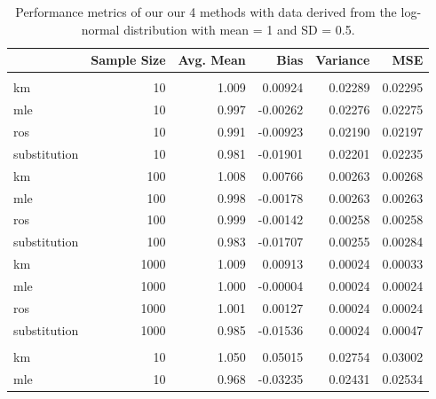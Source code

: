 \documentclass[12pt, twoside]{amherstthesis}
\begin{document}
\begin{table}

\caption{\label{tab:lntable}Performance metrics of our our 
             4 methods with data derived from the log-normal 
             distribution with mean = 1 and SD = 0.5.}
\centering
\fontsize{11.5}{13.5}\selectfont
\begin{tabular}[t]{lrrrrr}
\toprule
  & Sample Size & Avg. Mean & Bias & Variance & MSE\\
\midrule
\addlinespace[0.3em]
\multicolumn{6}{l}{\textbf{Censoring Rate = 0.1}}\\
\hspace{1em}km & 10 & 1.009 & 0.00924 & 0.02289 & 0.02295\\
\hspace{1em}mle & 10 & 0.997 & -0.00262 & 0.02276 & 0.02275\\
\hspace{1em}ros & 10 & 0.991 & -0.00923 & 0.02190 & 0.02197\\
\hspace{1em}substitution & 10 & 0.981 & -0.01901 & 0.02201 & 0.02235\\
\hspace{1em}km & 100 & 1.008 & 0.00766 & 0.00263 & 0.00268\\
\hspace{1em}mle & 100 & 0.998 & -0.00178 & 0.00263 & 0.00263\\
\hspace{1em}ros & 100 & 0.999 & -0.00142 & 0.00258 & 0.00258\\
\hspace{1em}substitution & 100 & 0.983 & -0.01707 & 0.00255 & 0.00284\\
\hspace{1em}km & 1000 & 1.009 & 0.00913 & 0.00024 & 0.00033\\
\hspace{1em}mle & 1000 & 1.000 & -0.00004 & 0.00024 & 0.00024\\
\hspace{1em}ros & 1000 & 1.001 & 0.00127 & 0.00024 & 0.00024\\
\hspace{1em}substitution & 1000 & 0.985 & -0.01536 & 0.00024 & 0.00047\\
\addlinespace[1em]
\multicolumn{6}{l}{\textbf{Censoring Rate = 0.3}}\\
\hspace{1em}km & 10 & 1.050 & 0.05015 & 0.02754 & 0.03002\\
\hspace{1em}mle & 10 & 0.968 & -0.03235 & 0.02431 & 0.02534\\

\end{tabular}
\end{table}
\end{document}
